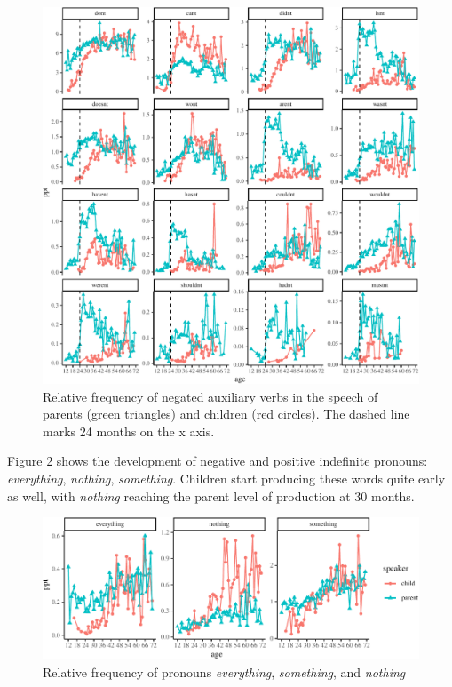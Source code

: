 \documentclass[man,floatsintext,draftall]{apa6}
\begin{document}
\begin{figure}
\centering
\includegraphics{negation_production_files/figure-latex/AuxWords-1.pdf}
\caption{\label{fig:AuxWords}Relative frequency of negated auxiliary verbs in the speech of parents (green triangles) and children (red circles). The dashed line marks 24 months on the x axis.}
\end{figure}

Figure \ref{fig:pronouns} shows the development of negative and positive indefinite pronouns: \emph{everything}, \emph{nothing}, \emph{something}. Children start producing these words quite early as well, with \emph{nothing} reaching the parent level of production at 30 months.

\begin{figure}
\centering
\includegraphics{negation_production_files/figure-latex/pronouns-1.pdf}
\caption{\label{fig:pronouns}Relative frequency of pronouns \emph{everything}, \emph{something}, and \emph{nothing}}
\end{figure}
\end{document}
